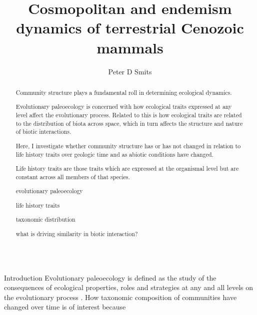 \documentclass[final]{beamer}\usepackage[]{graphicx}\usepackage[]{color}
\title{Cosmopolitan and endemism dynamics of terrestrial Cenozoic mammals}
\author{Peter D Smits}
\institute{Committee on Evolutionary Biology, University of Chicago}
\newlength{\onecolwid}
\begin{document}
\begin{frame}[t]
  \begin{columns}
    \begin{column}{\onecolwid}
      \begin{block}{}
        \begin{abstract}
          Community structure plays a fundamental roll in determining ecological dynamics. 
          
          Evolutionary paleoecology is concerned with how ecological traits expressed at any level affect the evolutionary process. Related to this is how ecological traits are related to the distribution of biota across space, which in turn affects the structure and nature of biotic interactions.

          Here, I investigate whether community structure has or has not changed in relation to life history traits over geologic time and as abiotic conditions have changed.

          Life history traits are those traits which are expressed at the organismal level but are constant across all members of that species.


          evolutionary paleoecology

          life history traits

          taxonomic distribution

          what is driving similarity in biotic interaction?
        \end{abstract}
        
      \end{block}
      \begin{block}{Introduction}
%
        Evolutionary paleoecology is defined as the study of the consequences of ecological properties, roles and strategies at any and all levels on the evolutionary process \citet{Kitchell1985a}. 
%
%
        How taxonomic composition of communities have changed over time is of interest because


\end{block}
\end{column}
\end{columns}
\end{frame}
\end{document}
